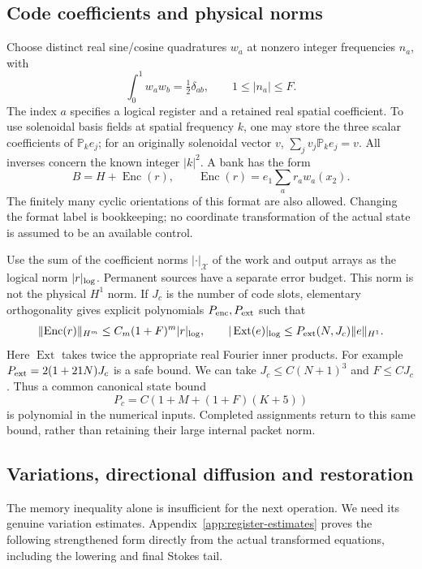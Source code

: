 \documentclass[11pt,a4paper]{amsart}
\theoremstyle{definition}
\theoremstyle{remark}
\numberwithin{equation}{section}
\newcommand{\PP}{\mathbb P}
\newcommand{\norm}[1]{\lVert #1\rVert}
\begin{document}
\subsection{Code coefficients and physical norms}
Choose distinct real sine/cosine quadratures $w_a$ at nonzero integer
frequencies $n_a$, with
\[
 \int_0^1w_aw_b=\tfrac12\delta_{ab},\qquad
 1\le |n_a|\le F.
\]
The index $a$ specifies a logical register and a retained real spatial
coefficient.  To use solenoidal basis fields at spatial frequency $k$, one
may store the three scalar coefficients of $\PP_ke_j$; for an originally
solenoidal vector $v$, $\sum_jv_j\PP_ke_j=v$.  All inverses concern the known
integer $|k|^2$.  A bank has the form
\begin{equation}\label{eq:register-bank}
 B=H+\operatorname{Enc}(r),\qquad
 \operatorname{Enc}(r)=e_1\sum_a r_aw_a(x_2).
\end{equation}
The finitely many cyclic orientations of this format are also allowed.
Changing the format label is bookkeeping; no coordinate transformation of
the actual state is assumed to be an available control.

Use the sum of the coefficient norms $|\cdot|_{\mathcal X}$ of the work and
output arrays as the logical norm $|r|_{\rm log}$.  Permanent sources have
a separate error budget.  This norm is not the physical $H^1$ norm.  If
$J_c$ is the number of code slots, elementary orthogonality gives explicit
polynomials $P_{\rm enc},P_{\rm ext}$ such that
\begin{equation}\label{eq:code-conditioning}
 \norm{\operatorname{Enc}(r)}_{H^m}
       \le C_m(1+F)^m|r|_{\rm log},\qquad
 |\operatorname{Ext}(e)|_{\rm log}
       \le P_{\rm ext}(N,J_c)\norm e_{H^1}.
\end{equation}
Here $\operatorname{Ext}$ takes twice the appropriate real Fourier inner
products.  For example $P_{\rm ext}=2(1+21N)J_c$ is a safe bound.
We can take $J_c\le C(N+1)^3$ and $F\le CJ_c$.  Thus a common canonical
state bound
\begin{equation}\label{eq:canonical-register-bound}
 P_c=C(1+M+(1+F)(K+5))
\end{equation}
is polynomial in the numerical inputs.  Completed assignments return to
this same bound, rather than retaining their large internal packet norm.

\subsection{Variations, directional diffusion and restoration}
The memory inequality alone is insufficient for the next operation.  We
need its genuine variation estimates.  Appendix~\ref{app:register-estimates}
proves the following strengthened form directly from the actual transformed
equations, including the lowering and final Stokes tail.
\end{document}
